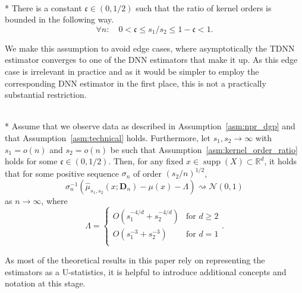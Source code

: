 \begin{boxD}
	\begin{asm}\label{asm:kernel_order_ratio}\mbox{}\\*
		There is a constant $\mathfrak{c} \in (0,1/2)$ such that the ratio of kernel orders is bounded in the following way.
		\begin{equation}
			\forall n: \quad 0 < \mathfrak{c} \leq s_1 / s_2 \leq 1 - \mathfrak{c} < 1.
		\end{equation}
	\end{asm}
\end{boxD}
We make this assumption to avoid edge cases, where asymptotically the TDNN estimator converges to one of the DNN estimators that make it up.
As this edge case is irrelevant in practice and as it would be simpler to employ the corresponding DNN estimator in the first place, this is not a practically substantial restriction.
\begin{boxD}
	\begin{thm}\label{thm:dem3}\mbox{}\\*
		Assume that we observe data as described in Assumption~\ref{asm:npr_dgp} and that Assumption~\ref{asm:technical} holds.
		Furthermore, let $s_1, s_2 \rightarrow \infty$ with $s_1 = o(n)$ and $s_2 = o(n)$ be such that Assumption~\ref{asm:kernel_order_ratio} holds for some $\mathfrak{c} \in (0, 1/2)$.
		Then, for any fixed $x \in \operatorname{supp}(X) \subset \mathbb{R}^d$, it holds that for some positive sequence $\sigma_n$ of order $(s_2/n)^{1/2}$,
		\begin{equation}
			\sigma_n^{-1} \left(\hat{\mu}_{s_1, s_2}\left(x; \mathbf{D}_n\right) - \mu(x) - \Lambda\right) \rightsquigarrow \mathcal{N}(0,1)
		\end{equation}
		as $n \rightarrow \infty$, where
		\begin{equation*}
			\Lambda = \begin{cases}
				O\left(s_1^{-4/d} + s_2^{-4/d}\right) & \text{for } d \geq 2 \\
				O\left(s_1^{-3} + s_2^{-3}\right)     & \text{for } d = 1    \\
			\end{cases} .
		\end{equation*}
	\end{thm}
\end{boxD}
As most of the theoretical results in this paper rely on representing the estimators as a U-statistics, it is helpful to introduce additional concepts and notation at this stage.
